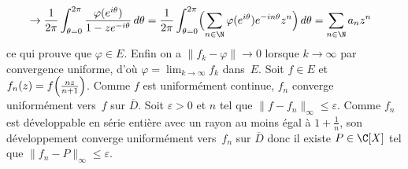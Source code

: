 {\begin{enumerate}
{\begin{align*}
        &\to \frac1{2\pi} \int_{\theta=0}^{2\pi}\frac{\varphi(e^{i\theta})}{1-ze^{-i\theta}}\, d\theta
         = \frac1{2\pi} \int_{\theta=0}^{2\pi}\Bigl(\sum_{n\in\N}\varphi(e^{i\theta})e^{-in\theta}z^n\Bigr)\, d\theta
         = \sum_{n\in\N}a_nz^n\cr
    \end{align*}
    ce qui prouve que $\varphi\in E$. Enfin on a $\|f_k-\varphi\| \to 0$ lorsque $k\to\infty$
    par convergence uniforme, d'où $\varphi = \lim_{k\to\infty}f_k$ dans~$E$.
Soit $f\in E$ et $f_n(z) = f\Bigl(\frac{nz}{n+1}\Bigr)$.
    Comme $f$ est uniformément continue, $f_n$ converge uniformément vers~$f$
    sur $\overline D$. Soit $\varepsilon>0$ et $n$ tel que $\|f-f_n\|_\infty \le \varepsilon$.
    Comme $f_n$ est développable en série entière avec un rayon au moins égal à $1+\frac1n$,
    son développement converge uniformément vers~$f_n$ sur $\overline D$ donc
    il existe $P\in\C[X]$ tel que $\|f_n-P\|_\infty \le \varepsilon$.
}
\end{enumerate}
}
